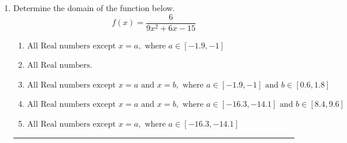 \documentclass[14pt]{extbook}
\newcommand{\litem}[1]{\item#1\hspace*{-1cm}\rule{\textwidth}{0.4pt}}
\begin{document}
\begin{enumerate}
\litem{
Determine the domain of the function below.\[ f(x) = \frac{6}{9x^{2} +6 x -15} \]\begin{enumerate}[label=\Alph*.]
\item \( \text{All Real numbers except } x = a, \text{ where } a \in [-1.9, -1] \)
\item \( \text{All Real numbers.} \)
\item \( \text{All Real numbers except } x = a \text{ and } x = b, \text{ where } a \in [-1.9, -1] \text{ and } b \in [0.6, 1.8] \)
\item \( \text{All Real numbers except } x = a \text{ and } x = b, \text{ where } a \in [-16.3, -14.1] \text{ and } b \in [8.4, 9.6] \)
\item \( \text{All Real numbers except } x = a, \text{ where } a \in [-16.3, -14.1] \)


\end{enumerate}}
\end{enumerate}
\end{document}
